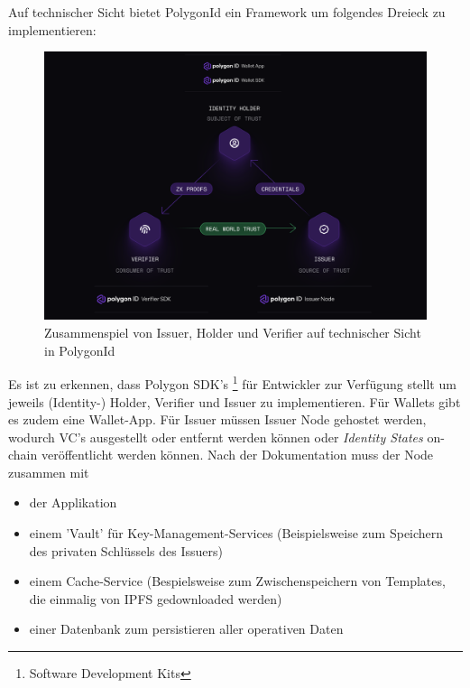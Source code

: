 Auf technischer Sicht bietet PolygonId ein Framework um folgendes Dreieck zu implementieren:
\begin{figure}[h]
	\centering
	\includegraphics[scale=0.4]{media/polygonIddreieck}
	\caption{Zusammenspiel von Issuer, Holder und Verifier auf technischer Sicht in PolygonId \cite{ID31}}
	\label{fig:meine-grafik}
\end{figure}

Es ist zu erkennen, dass Polygon SDK's \footnote{Software Development Kits} für Entwickler zur Verfügung stellt um jeweils (Identity-) Holder, Verifier und Issuer zu implementieren. Für Wallets gibt es zudem eine Wallet-App. Für Issuer müssen Issuer Node gehostet werden, wodurch VC's ausgestellt oder entfernt werden können oder \textsl{Identity States} on-chain veröffentlicht werden können. Nach der Dokumentation \cite{ID38} muss der Node zusammen mit 

\begin{itemize}
	\item der Applikation
	\item einem 'Vault' für Key-Management-Services (Beispielsweise zum Speichern des privaten Schlüssels des Issuers)
	\item einem Cache-Service (Bespielsweise zum Zwischenspeichern von Templates, die einmalig von IPFS gedownloaded werden)
	\item einer Datenbank zum persistieren aller operativen Daten
\end{itemize}

